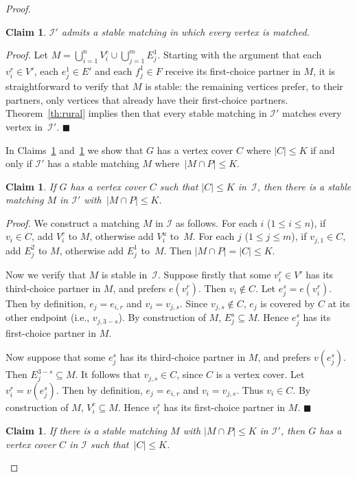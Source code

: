 \documentclass[preprint,12pt]{elsarticle}
\newcommand{\myqed}{$\blacksquare$}
\newcommand{\myproof}{\noindent\textit{Proof. }}
\newtheorem{claim}[theorem]{Claim}
\begin{document}
\begin{proof}
\begin{claim}
	\label{cl:bp1}
	$\mathcal{I}'$ admits a stable matching in which every vertex is matched. 
\end{claim}

	\myproof Let $M=\bigcup_{i=1}^n V_i^c \cup \bigcup_{j=1}^m E_j^1$. Starting with the argument that each $v_i^r\in V'$, each $e^1_j\in E'$ and each $f^1_j\in F$ receive its first-choice partner in $M$, it is straightforward to verify that $M$ is stable: the remaining vertices prefer, to their partners, only vertices that already have their first-choice partners.  Theorem~\ref{th:rural} implies then that every stable matching in $\mathcal{I}'$ matches every vertex in~$\mathcal{I}'$. \myqed 

In Claims~\ref{cl:bp2} and~\ref{cl:bp3} we show that $G$ has a vertex cover $C$ where $|C|\leq K$ if and only if $\mathcal{I}'$ has a stable matching $M$ where~$|M\cap P|\leq K$.

\begin{claim}
\label{cl:bp2}
	If $G$ has a vertex cover $C$ such that $|C|\leq K$ in~$\mathcal{I}$, then there is a stable matching $M$ in $\mathcal{I}'$ with~$|M\cap P|\leq K$.
\end{claim}

	\myproof We construct a matching $M$ in $\mathcal{I}$ as follows. For each $i$ ($1\leq i\leq n$), if $v_i\in C$, add $V_i^c$ to $M$, otherwise add $V_i^u$ to~$M$. For each $j$ ($1\leq j\leq m$), if $v_{j,1}\in C$, add $E_j^2$ to $M$, otherwise add $E_j^1$ to~$M$. Then $|M\cap P|=|C|\leq K$.

	Now we verify that $M$ is stable in~$\mathcal{I}$. Suppose firstly that some $v_i^r\in V'$ has its third-choice partner in $M$, and prefers $e(v_i^r)$.  Then $v_i\notin C$.  Let $e_j^s=e(v_i^r)$.  Then by definition, $e_j=e_{i,r}$ and $v_i=v_{j,s}$.  Since $v_{j,s}\notin C$, $e_j$ is covered by $C$ at its other endpoint (i.e., $v_{j,3-s}$).  By construction of $M$, $E_j^s\subseteq M$.  Hence $e_j^s$ has its first-choice partner in $M$.
    
    Now suppose that some $e_j^s$ has its third-choice partner in $M$, and prefers $v(e_j^s)$.  Then $E_j^{3-s}\subseteq M$.  It follows that $v_{j,s}\in C$, since $C$ is a vertex cover.  Let $v_i^r=v(e_j^s)$.  Then by definition, $e_j=e_{i,r}$ and $v_i=v_{j,s}$.  Thus $v_i\in C$.  By construction of $M$, $V_i^c\subseteq M$.  Hence $v_i^r$ has its first-choice partner in $M$.
\myqed


\begin{claim}
	\label{cl:bp3}
	If there is a stable matching $M$ with $|M\cap P|\leq K$ in $\mathcal{I'}$, then $G$ has a vertex cover $C$ in $\mathcal{I}$ such that~$|C|\leq K$.
\end{claim}


\end{proof}
\end{document}
